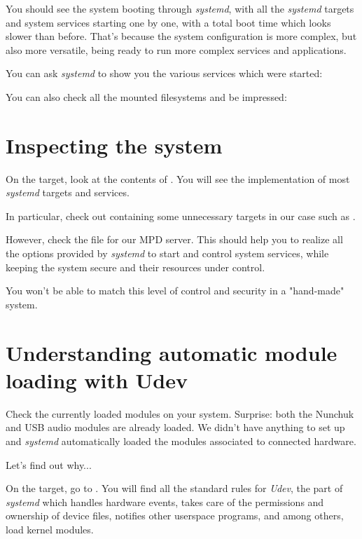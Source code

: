 You should see the system booting through {\em systemd}, with all the
{\em systemd} targets and system services starting one by one, with a
total boot time which looks slower than before. That's because the
system configuration is more complex, but also more versatile, being
ready to run more complex services and applications.

You can ask {\em systemd} to show you the various services which were
started:


You can also check all the mounted filesystems and be impressed:


\section{Inspecting the system}

On the target, look at the contents of . You will
see the implementation of most {\em systemd} targets and services.

In particular, check out  containing
some unnecessary targets in our case such as .

However, check the  file for our MPD server.
This should help you to realize all the options provided
by {\em systemd} to start and control system services, while
keeping the system secure and their resources under control.

You won't be able to match this level of control and security in a
"hand-made" system.

\section{Understanding automatic module loading with Udev}

Check the currently loaded modules on your system. Surprise: both
the Nunchuk and USB audio modules are already loaded.
We didn't have anything to set up and {\em systemd} automatically loaded
the modules associated to connected hardware.

Let's find out why...

On the target, go to . You will find all the
standard rules for {\em Udev}, the part of {\em systemd} which handles
hardware events, takes care of the permissions and ownership of device
files, notifies other userspace programs, and among others, load
kernel modules.

